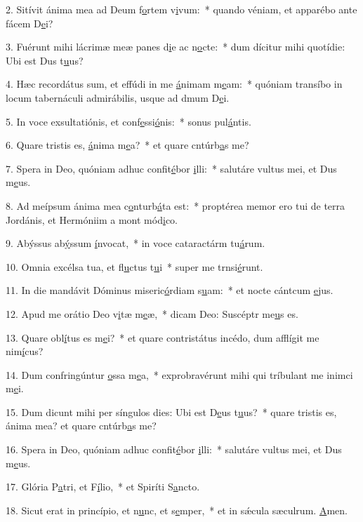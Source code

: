 2. Sitívit ánima mea ad Deum f\uline{o}rtem v\uline{i}vum:~* quando véniam, et apparébo ante fácem D\uline{e}i?\par 
3. Fuérunt mihi lácrimæ meæ panes d\uline{i}e ac n\uline{o}cte:~* dum dícitur mihi quotídie: Ubi est Dus t\uline{u}us?\par 
4. Hæc recordátus sum, et effúdi in me \uline{á}nimam m\uline{e}am:~* quóniam transíbo in locum tabernáculi admirábilis, usque ad dmum D\uline{e}i.\par 
5. In voce exsultatiónis, et conf\uline{e}ssi\uline{ó}nis:~* sonus pul\uline{á}ntis.\par 
6. Quare tristis es, \uline{á}nima m\uline{e}a?~* et quare cntúrb\uline{a}s me?\par 
7. Spera in Deo, quóniam adhuc confit\uline{é}bor \uline{i}lli:~* salutáre vultus mei, et Dus m\uline{e}us.\par 
8. Ad meípsum ánima mea c\uline{o}nturb\uline{á}ta est:~* proptérea memor ero tui de terra Jordánis, et Hermóniim a mont mód\uline{i}co.\par 
9. Abýssus ab\uline{ý}ssum \uline{í}nvocat,~* in voce cataractárm tu\uline{á}rum.\par 
10. Omnia excélsa tua, et fl\uline{u}ctus t\uline{u}i~* super me trnsi\uline{é}runt.\par 
11. In die mandávit Dóminus miseric\uline{ó}rdiam s\uline{u}am:~* et nocte cántcum \uline{e}jus.\par 
12. Apud me orátio Deo v\uline{i}tæ m\uline{e}æ,~* dicam Deo: Suscéptr me\uline{u}s es.\par 
13. Quare obl\uline{í}tus es m\uline{e}i?~* et quare contristátus incédo, dum afflígit me nim\uline{í}cus?\par 
14. Dum confringúntur \uline{o}ssa m\uline{e}a,~* exprobravérunt mihi qui tríbulant me inimci m\uline{e}i.\par 
15. Dum dicunt mihi per síngulos dies: Ubi est D\uline{e}us t\uline{u}us?~* quare tristis es, ánima mea? et quare cntúrb\uline{a}s me?\par 
16. Spera in Deo, quóniam adhuc confit\uline{é}bor \uline{i}lli:~* salutáre vultus mei, et Dus m\uline{e}us.\par 
17. Glória P\uline{a}tri, et F\uline{í}lio,~* et Spiríti S\uline{a}ncto.\par 
18. Sicut erat in princípio, et n\uline{u}nc, et s\uline{e}mper,~* et in sǽcula sæculrum. \uline{A}men.\par 
